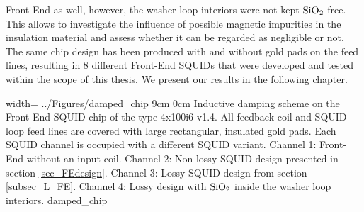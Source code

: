 Front-End as well, however, the washer loop interiors were not kept $\rm SiO_2$-free. This allows to investigate the influence of possible magnetic impurities in the insulation material and assess whether it can be regarded as negligible or not. The same chip design has been produced with and without gold pads on the feed lines, resulting in 8 different Front-End SQUIDs that were developed and tested within the scope of this thesis. We present our results in the following chapter.     

{width=\textwidth} %
{../Figures/damped_chip}
{9cm} %
{0cm}
{Inductive damping scheme on the Front-End SQUID chip of the type 4x100i6 v1.4. All feedback coil and SQUID loop feed lines are covered with large rectangular, insulated gold pads. Each SQUID channel is occupied with a different SQUID variant. Channel 1: Front-End without an input coil. Channel 2: Non-lossy SQUID design presented in section \ref{sec_FEdesign}. Channel 3: Lossy SQUID design from section \ref{subsec_L_FE}. Channel 4: Lossy design with $\rm SiO_2$ inside the washer loop interiors.}
{damped_chip}

